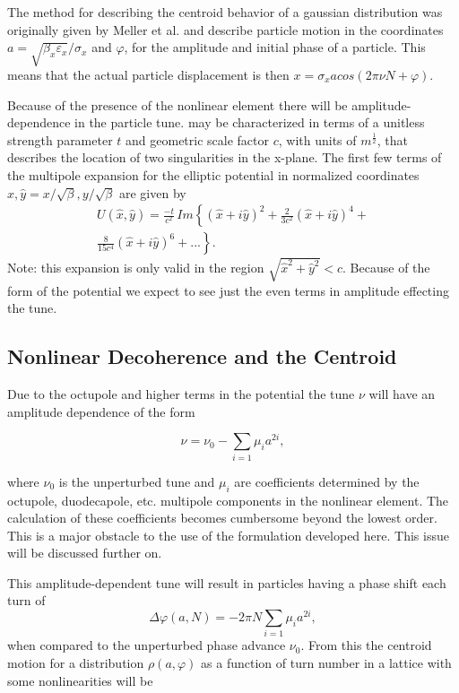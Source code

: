 \documentclass[aps,prstab,twocolumn, groupedaddress]{revtex4-1}
\begin{document}
The method for describing the centroid behavior of a gaussian distribution was originally 
given by Meller et al. \cite{meller} and describe particle motion in the coordinates $ a = 
\sqrt{\beta_x \varepsilon_x} / \sigma_x$ and $\varphi$, for the amplitude and initial phase 
of a 
particle. This means that the actual particle displacement is then $x = \sigma_x a cos(2 \pi 
\nu N + \varphi)$. 

Because of the presence of the nonlinear element there will be amplitude-dependence in 
the particle tune. may be characterized in terms of
a unitless strength parameter $t$ and geometric scale factor $c$, with units of
$m^\frac{1}{2}$, that describes the location of two singularities in the x-plane. The first
few terms of the multipole expansion for the elliptic potential in normalized coordinates
$\hat{x}, \hat{y} = x / \sqrt{\beta}, y / \sqrt{\beta}$ are given by %
\begin{multline} \label{eq:expansion}
U(\hat{x}, \hat{y}) = \frac{-t}{c^2} \, Im\left\lbrace (\hat{x}+i\hat{y})^2 +
\frac{2}{3c^2}(\hat{x} + i\hat{y})^4 + \right. \\
\left. \frac{8}{15c^4}(\hat{x}+i\hat{y})^6 + ... \right\rbrace.
\end{multline}
Note: this expansion is only valid in the region $\sqrt{\hat{x}^2 +\hat{y}^2} < c$. Because 
of the form of the potential we expect to see just the even 
terms in amplitude effecting the tune.

\subsection{Nonlinear Decoherence and the Centroid}

Due to the octupole and higher terms in the potential the tune $\nu$ will have an 
amplitude dependence of the form

\begin{equation} \label{eq:tune}
\nu = \nu_0 - \sum_{i=1} \mu_i a^{2i},
\end{equation}

where $\nu_0$ is the unperturbed tune and $\mu_i$ are coefficients determined by the 
octupole, duodecapole, etc. multipole components in the nonlinear element. The 
calculation of these coefficients becomes cumbersome beyond the lowest order. This is a 
major obstacle to the use of the formulation developed here. This issue will be discussed 
further on.

This amplitude-dependent tune will result in particles having a phase shift each turn of
\begin{equation}
\Delta \varphi(a, N) = -2 \pi N \sum_{i=1} \mu_i a^{2i},
\end{equation}
when compared to the unperturbed phase advance $\nu_0$. From this the centroid 
motion for a distribution $\rho(a, \varphi)$ as a function of turn number in a lattice with 
some nonlinearities will be
\end{document}

